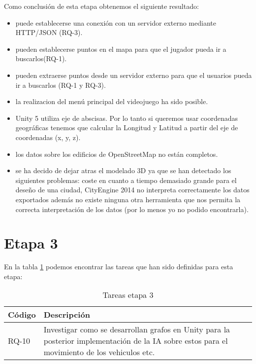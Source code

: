 Como conclusión de esta etapa obtenemos el siguiente resultado:
\begin{itemize}
	\item puede establecerse una conexión con un servidor externo mediante HTTP/JSON (RQ-3). 
	\item pueden establecerse puntos en el mapa para que el jugador pueda ir a buscarlos(RQ-1). 
	\item pueden extraerse puntos desde un servidor externo para que el usuarios pueda ir a buscarlos (RQ-1 y RQ-3).
	\item la realizacion del menú principal del videojuego ha sido posible.
	\item Unity 5 utiliza eje de abscisas. Por lo tanto si queremos usar coordenadas geográficas tenemos que calcular la Longitud y Latitud a partir del eje de coordenadas (x, y, z).
	\item los datos sobre los edificios de OpenStreetMap no están completos.
	\item se ha decido de dejar atras el modelado 3D ya que se han detectado los siguientes problemas: coste en cuanto a tiempo demasiado grande para el deseño de una ciudad, CityEngine 2014 no interpreta correctamente los datos exportados además no existe ninguna otra herramienta que nos permita la correcta interpretación de los datos (por lo menos yo no podido encontrarla).
\end{itemize}

\section{Etapa 3}
\thispagestyle{empty}

En la tabla \ref{tabla:requisitosEtapa3} podemos encontrar las tareas que han sido definidas para esta etapa:

\begin{table}[H]
\begin{center}
\begin{tabular}{p{1.5cm}| p{10.5cm}}
\hline 
Código & Descripción \\
\hline \hline
RQ-10  & Investigar como se desarrollan grafos en Unity para la posterior implementación de la IA sobre estos para el movimiento de los vehiculos etc. \\ \hline
\end{tabular}
\caption{Tareas etapa 3}
\label{tabla:requisitosEtapa3}
\end{center}
\end{table}

